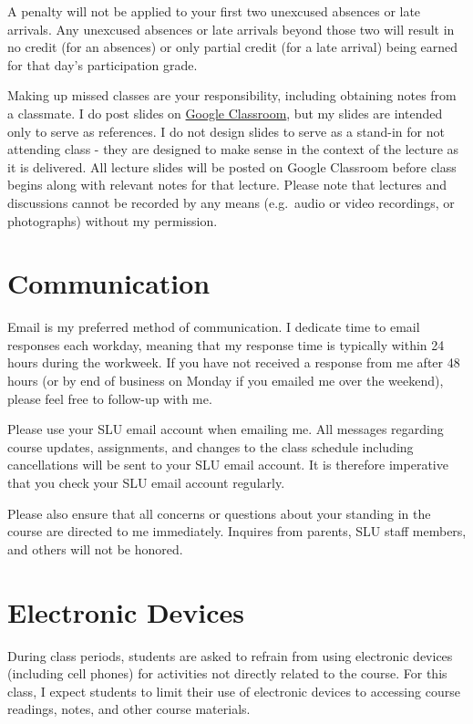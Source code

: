 \documentclass[]{book}
\begin{document}
A penalty will not be applied to your first two unexcused absences or late arrivals. Any unexcused absences or late arrivals beyond those two will result in no credit (for an absences) or only partial credit (for a late arrival) being earned for that day's participation grade.

Making up missed classes are your responsibility, including obtaining notes from a classmate. I do post slides on \href{https://classroom.google.com}{Google Classroom}, but my slides are intended only to serve as references. I do not design slides to serve as a stand-in for not attending class - they are designed to make sense in the context of the lecture as it is delivered. All lecture slides will be posted on Google Classroom before class begins along with relevant notes for that lecture. Please note that lectures and discussions cannot be recorded by any means (e.g.~audio or video recordings, or photographs) without my permission.

\hypertarget{communication}{%
\section{Communication}\label{communication}}

Email is my preferred method of communication. I dedicate time to email responses each workday, meaning that my response time is typically within 24 hours during the workweek. If you have not received a response from me after 48 hours (or by end of business on Monday if you emailed me over the weekend), please feel free to follow-up with me.

Please use your SLU email account when emailing me. All messages regarding course updates, assignments, and changes to the class schedule including cancellations will be sent to your SLU email account. It is therefore imperative that you check your SLU email account regularly.

Please also ensure that all concerns or questions about your standing in the course are directed to me immediately. Inquires from parents, SLU staff members, and others will not be honored.

\hypertarget{electronic-devices}{%
\section{Electronic Devices}\label{electronic-devices}}

During class periods, students are asked to refrain from using electronic devices (including cell phones) for activities not directly related to the course. For this class, I expect students to limit their use of electronic devices to accessing course readings, notes, and other course materials.
\end{document}
